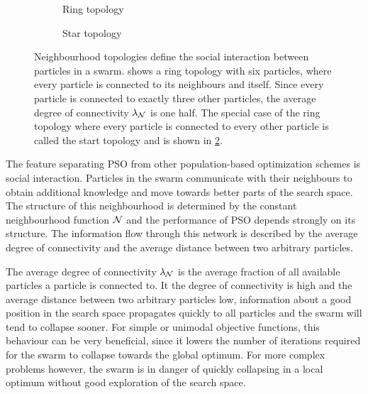\begin{figure}[t]
    \centering
    \begin{subfigure}{\subfigurewidth}
        \centering
        
        \caption{Ring topology}
        \label{fig:pso_topology:ring}
    \end{subfigure}
    \begin{subfigure}{\subfigurewidth}
        \centering
        
        \caption{Star topology}
        \label{fig:pso_topology:star}
    \end{subfigure}
    \caption[PSO neighbourhood topologies]{
        Neighbourhood topologies define the social interaction between particles in a swarm.
         shows a ring topology with six particles, where every particle is connected to its neighbours and itself.
        Since every particle is connected to exactly three other particles, the average degree of connectivity $\lambda_{\operatorname{\mathcal{N}}}$ is one half.
        The special case of the ring topology where every particle is connected to every other particle is called the start topology and is shown in \cref{fig:pso_topology:star}.
    }
    \label{fig:pso_topology}
\end{figure}
The feature separating PSO from other population-based optimization schemes is social interaction.
Particles in the swarm communicate with their neighbours to obtain additional knowledge and move towards better parts of the search space.
The structure of this neighbourhood is determined by the constant neighbourhood function $\operatorname{\mathcal{N}}$ and the performance of PSO depends strongly on its structure.
The information flow through this network is described by the average degree of connectivity and the average distance between two arbitrary particles.

The average degree of connectivity $\lambda_{\operatorname{\mathcal{N}}}$ is the average fraction of all available particles a particle is connected to.
It the degree of connectivity is high and the average distance between two arbitrary particles low, information about a good position in the search space propagates quickly to all particles and the swarm will tend to collapse sooner.
For simple or unimodal objective functions, this behaviour can be very beneficial, since it lowers the number of iterations required for the swarm to collapse towards the global optimum.
For more complex problems however, the swarm is in danger of quickly collapsing in a local optimum without good exploration of the search space.

